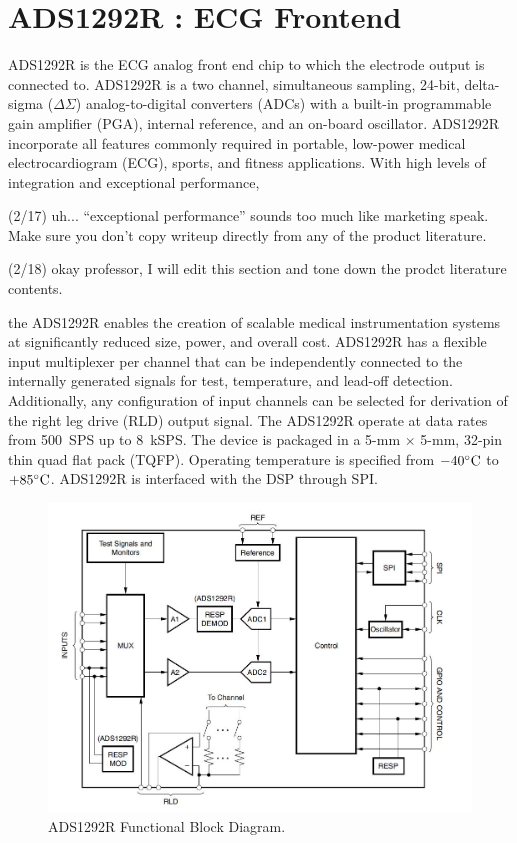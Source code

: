 \section{ADS1292R : ECG Frontend}

ADS1292R is the ECG analog front end chip to which the electrode
output is connected to. ADS1292R is a two channel, simultaneous
sampling, 24-bit, delta-sigma ($\Delta$$\Sigma$) analog-to-digital
converters (ADCs) with a built-in programmable gain amplifier (PGA),
internal reference, and an on-board oscillator. ADS1292R incorporate
all features commonly required in portable, low-power medical
electrocardiogram (ECG), sports, and fitness applications. With high
levels of integration and exceptional performance,

\begin{cmtPai}
	(2/17) uh... ``exceptional performance'' sounds too much like
	marketing speak.  Make sure you don't copy writeup directly from
any of the product literature.
\end{cmtPai}
\begin{cmtSMS}
	(2/18) okay professor, I will edit this section and tone down the prodct literature contents.
\end{cmtSMS}
the ADS1292R enables the creation of scalable medical instrumentation
systems at significantly reduced size, power, and overall cost.
ADS1292R has a flexible input multiplexer per channel that can be
independently connected to the internally generated signals for test,
temperature, and lead-off detection. Additionally, any configuration
of input channels can be selected for derivation of the right leg
drive (RLD) output signal.  The ADS1292R operate at data rates from
500~SPS up to 8~kSPS. The device is packaged in a 5-mm $\times$ 5-mm,
32-pin thin quad flat pack (TQFP). Operating temperature is specified
from $-40^{\circ}\text{C}$ to $+85^{\circ}\text{C}$. ADS1292R is interfaced with the DSP
through SPI.

 \begin{figure}
 	\centering
 	\includegraphics[scale = 0.7 ]{ADS1292R}
\caption{ADS1292R Functional Block Diagram. \cite{ads}}
\label{ADS1292R}
 \end{figure}
 
